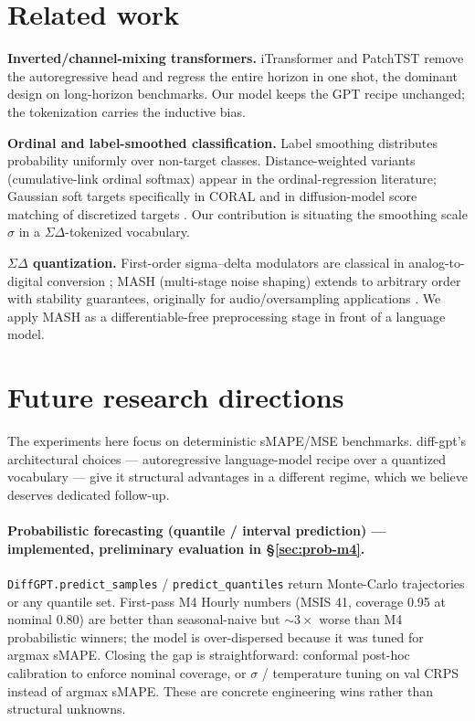 \documentclass[11pt]{article}
\theoremstyle{remark}
\begin{document}
\section{Related work}

\textbf{Inverted/channel-mixing transformers.} iTransformer
\cite{itransformer2024} and PatchTST \cite{patchtst2023} remove the
autoregressive head and regress the entire horizon in one shot, the
dominant design on long-horizon benchmarks. Our model keeps the GPT
recipe unchanged; the tokenization carries the inductive bias.

\textbf{Ordinal and label-smoothed classification.} Label smoothing
\cite{szegedy2016} distributes probability uniformly over non-target
classes. Distance-weighted variants (cumulative-link ordinal softmax)
appear in the ordinal-regression literature; Gaussian soft targets
specifically in CORAL \cite{cao2020} and in diffusion-model score
matching of discretized targets \cite{austin2021}. Our contribution is
situating the smoothing scale $\sigma$ in a $\Sigma\Delta$-tokenized
vocabulary.

\textbf{$\Sigma\Delta$ quantization.} First-order sigma--delta
modulators are classical in analog-to-digital conversion
\cite{candy1992}; MASH (multi-stage noise shaping) extends to arbitrary
order with stability guarantees, originally for audio/oversampling
applications \cite{hayashi1986}. We apply MASH as a differentiable-free
preprocessing stage in front of a language model.

\section{Future research directions}
\label{sec:future}

The experiments here focus on deterministic sMAPE/MSE benchmarks.
diff-gpt's architectural choices --- autoregressive language-model
recipe over a quantized vocabulary --- give it structural advantages in
a different regime, which we believe deserves dedicated follow-up.

\paragraph{Probabilistic forecasting (quantile / interval prediction)
--- implemented, preliminary evaluation in \S\ref{sec:prob-m4}.}
\texttt{DiffGPT.predict\_samples} / \texttt{predict\_quantiles} return
Monte-Carlo trajectories or any quantile set. First-pass M4 Hourly
numbers (MSIS 41, coverage 0.95 at nominal 0.80) are better than
seasonal-naive but $\sim\!3\times$ worse than M4 probabilistic winners;
the model is over-dispersed because it was tuned for argmax sMAPE.
Closing the gap is straightforward: conformal post-hoc calibration
to enforce nominal coverage, or $\sigma$ / temperature tuning on val
CRPS instead of argmax sMAPE. These are concrete engineering wins
rather than structural unknowns.
\end{document}

